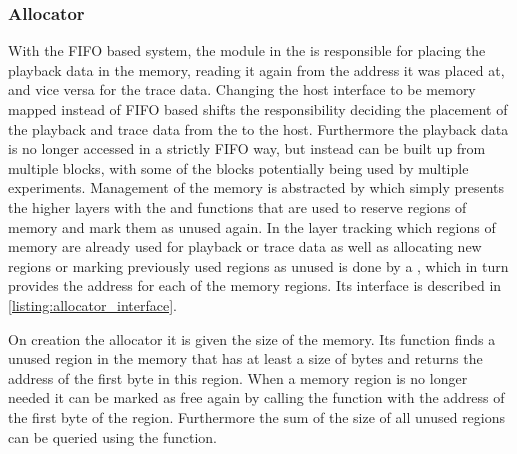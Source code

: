 \subsubsection{Allocator}
With the FIFO based system, the \VFIFO{} module in the \FPGA{} is responsible for placing the playback data in the \DDR{} memory, reading it again from the address it was placed at, and vice versa for the trace data.
Changing the host interface to be memory mapped instead of FIFO based shifts the responsibility deciding the placement of the playback and trace data from the \FPGA{} to the host.
Furthermore the playback data is no longer accessed in a strictly FIFO way, but instead can be built up from multiple blocks, with some of the blocks potentially being used by multiple experiments.
Management of the \DDR{} memory is abstracted by \ayo{} which simply presents the higher layers with the  and  functions that are used to reserve regions of memory and mark them as unused again.
In the \ayo{} layer tracking which regions of memory are already used for playback or trace data as well as allocating new regions or marking previously used regions as unused is done by a \allocator{}, which in turn provides the address for each of the memory regions. Its interface is described in \autoref{listing:allocator_interface}.

On creation the allocator it is given the size of the \DDR{} memory. Its  function finds a unused region in the memory that has at least a size of  bytes and returns the address of the first byte in this region.
When a memory region is no longer needed it can be marked as free again by calling the  function with the address of the first byte of the region.
Furthermore the sum of the size of all unused regions can be queried using the  function.


